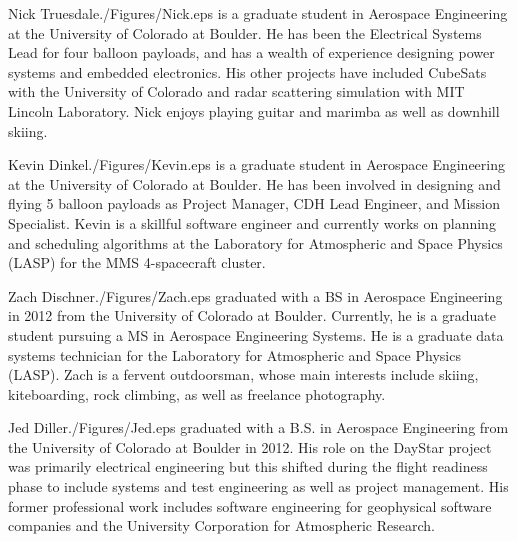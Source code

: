 \documentclass[twocolumn,letterpaper]{IEEEAerospace2012}
\newcommand{\rootdir}{./Figures/}
\begin{document}



\thebiography
\begin{biographywithpic}{Nick Truesdale}{\rootdir Nick.eps}
is a graduate student in Aerospace Engineering at the University of Colorado at Boulder.
He has been the Electrical Systems Lead for four balloon payloads, and has a wealth of experience designing power systems and embedded electronics. His other projects have included CubeSats with the University of Colorado and radar scattering simulation with MIT Lincoln Laboratory. Nick enjoys playing guitar and marimba as well as downhill skiing.
\end{biographywithpic}

\begin{biographywithpic} {Kevin Dinkel}{\rootdir Kevin.eps}
is a graduate student in Aerospace Engineering at the University of Colorado at Boulder. He has been involved in designing and flying 5 balloon payloads as Project Manager, CDH Lead Engineer, and Mission Specialist. Kevin is a skillful software engineer and currently works on planning and scheduling algorithms at the Laboratory for Atmospheric and Space Physics (LASP) for the MMS 4-spacecraft cluster.
\end{biographywithpic}

\begin{biographywithpic}{Zach Dischner}{\rootdir Zach.eps}
graduated with a BS in Aerospace Engineering in 2012 from the University of Colorado at Boulder. Currently, he is a graduate student pursuing a MS in Aerospace Engineering Systems. He is a graduate data systems technician for the Laboratory for Atmospheric and Space Physics (LASP). Zach is a fervent outdoorsman, whose main interests include skiing, kiteboarding, rock climbing, as well as freelance photography.
\end{biographywithpic}

\begin{biographywithpic}{Jed Diller}{\rootdir Jed.eps}
graduated with a B.S. in Aerospace Engineering from the University of Colorado at Boulder in 2012. His role on the DayStar project was primarily electrical engineering but this shifted during the flight readiness phase to include systems and test engineering as well as project management. His former professional work includes software engineering for geophysical software companies and the University Corporation for Atmospheric Research.
\end{biographywithpic}
\end{document}

